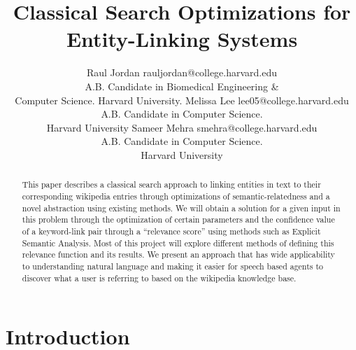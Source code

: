 \documentclass[twoside,11pt]{article}
\begin{document}
\title{Classical Search Optimizations for Entity-Linking Systems}

\author{\name Raul Jordan \email rauljordan@college.harvard.edu \\
       \addr A.B. Candidate in Biomedical Engineering \& \\
       Computer Science. Harvard University.
       \AND
       \name Melissa Lee \email lee05@college.harvard.edu \\
       \addr A.B. Candidate in Computer Science. \\
       Harvard University
       \AND
       \name Sameer Mehra \email smehra@college.harvard.edu \\
       \addr A.B. Candidate in Computer Science. \\
       Harvard University}


\maketitle


\begin{abstract}
This paper describes a classical search approach to linking entities in text to their corresponding wikipedia entries through optimizations of semantic-relatedness and a novel abstraction using existing methods. We will obtain a solution for a given input in this problem through the optimization of certain parameters and the confidence value of a keyword-link pair through a ``relevance score'' using methods such as Explicit Semantic Analysis. Most of this project will explore different methods of defining this relevance function and its results. We present an approach that has wide applicability to understanding natural language and making it easier for speech based agents to discover what a user is referring to based on the wikipedia knowledge base.
\end{abstract}


\section{Introduction}
\end{document}
